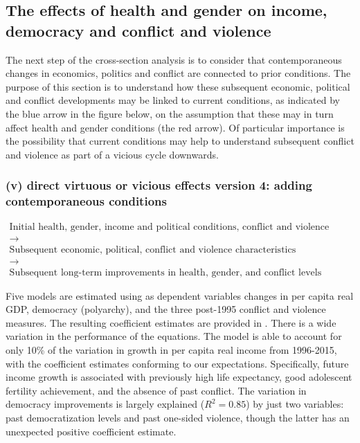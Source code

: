 \documentclass[12pt]{article}
\begin{document}
\subsection{The effects of health and gender on income, democracy and conflict and violence}

The next step of the cross-section analysis is to consider that contemporaneous changes in economics, politics and conflict are connected to prior conditions. The purpose of this section is to understand how these subsequent economic, political and conflict developments may be linked to current conditions, as indicated by the blue arrow in the figure below, on the assumption that these may in turn affect health and gender conditions (the red arrow). Of particular importance is the possibility that current conditions may help to understand subsequent conflict and violence as part of a vicious cycle downwards.

\subsubsection*{(v) direct virtuous or vicious effects version 4: adding contemporaneous conditions}

\begin{equation*}\begin{gathered}
\text{Initial health, gender,  income and political conditions, conflict and violence conditions} \\
\longrightarrow \\
\text{Subsequent economic, political, conflict and violence characteristics} \\
\longrightarrow \\
\text{Subsequent long-term improvements in health, gender, and conflict levels}
\end{gathered}\end{equation*}
\bigskip

Five models are estimated using as dependent variables changes in per capita real GDP,  democracy (polyarchy), and the three post-1995 conflict and violence measures.  The resulting coefficient estimates are provided in . There is a wide variation in the performance of the equations. The model is able to account for only 10\% of the variation in growth in per capita real income from 1996-2015, with the coefficient estimates conforming to our expectations. Specifically, future income growth is associated with previously high life expectancy, good adolescent fertility achievement, and the absence of past conflict. The variation in democracy improvements is largely explained ($R^2 = 0.85$) by just two variables: past democratization levels and past one-sided violence, though the latter has an unexpected  positive coefficient estimate.
\end{document}
